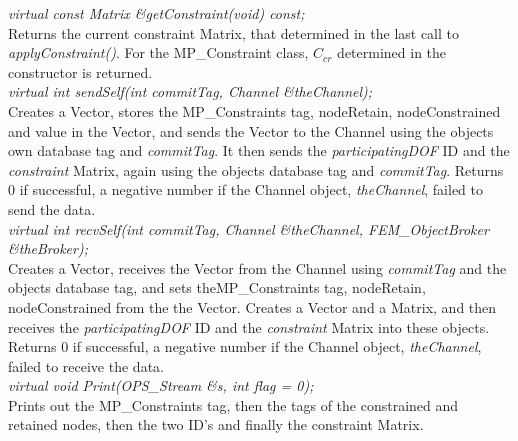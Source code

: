 {\em virtual const Matrix \&getConstraint(void) const;} \\
Returns the current constraint Matrix, that determined in the last
call to {\em applyConstraint()}. For the MP\_Constraint class, $C_{cr}$
determined in the constructor is returned. \\

{\em virtual int sendSelf(int commitTag, Channel \&theChannel);} \\
Creates a Vector, stores the MP\_Constraints tag, nodeRetain,
nodeConstrained and value in the Vector, and sends the Vector to the
Channel using the objects own database tag and {\em commitTag}. It then
sends the {\em participatingDOF} ID and the {\em constraint}
Matrix, again using the objects database tag and {\em
commitTag}. Returns $0$ if successful, a negative number if the
Channel object, {\em theChannel}, failed to send the data. \\ 

{\em virtual int recvSelf(int commitTag, Channel \&theChannel,
FEM\_ObjectBroker \&theBroker);} \\ 
Creates a Vector, receives the Vector from the Channel using {\em
commitTag} and the objects database tag, and sets theMP\_Constraints
tag, nodeRetain, nodeConstrained from the the Vector. Creates a
Vector and a Matrix, and then receives the {\em participatingDOF} ID
and the {\em constraint} Matrix into these objects. Returns $0$ if
successful, a negative number if the Channel object, {\em
theChannel}, failed to receive the data.\\ 

{\em virtual void Print(OPS_Stream \&s, int flag = 0);} \\
Prints out the MP\_Constraints tag, then the tags of the constrained
and retained nodes, then the two ID's and finally the constraint Matrix.\\






